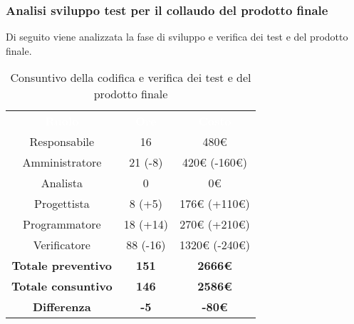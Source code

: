 \subsubsection{Analisi sviluppo test per il collaudo del prodotto finale}
Di seguito viene analizzata la fase di sviluppo e verifica dei test e del prodotto finale.
\begin{table}[H]
\centering\renewcommand{\arraystretch}{1.5}
\caption{Consuntivo della codifica e verifica dei test e del prodotto finale}
\vspace{0.2cm}
\begin{tabular}{ c c c }
\rowcolor{redafk}
\textcolor{white}{\textbf{Ruolo}} & \textcolor{white}{\textbf{Ore}} &
\textcolor{white}{\textbf{Costo}}  \\
Responsabile 	& 16 & 480€ \\
Amministratore 	& 21 (-8)  & 420€ (-160€)\\
Analista 		&  0 & 0€ \\
Progettista		&  8 (+5) & 176€ (+110€) \\
Programmatore	&  18 (+14) & 270€ (+210€) \\
Verificatore 	&  88 (-16) & 1320€ (-240€) \\
\textbf{Totale preventivo} & \textbf{151} & \textbf{2666€}  \\
\textbf{Totale consuntivo} &  \textbf{146}& \textbf{2586€} \\
\rowcolor{lastrowcolor}
\textbf{Differenza} & \textbf{-5} & \textbf{-80€} \\
\end{tabular}
\end{table}

